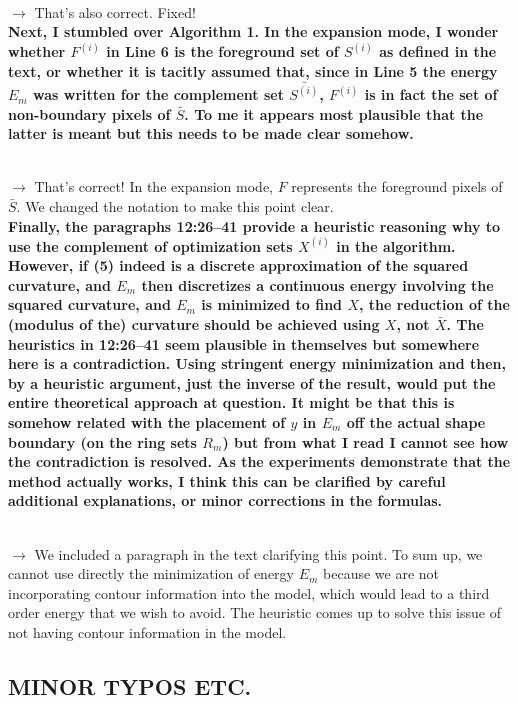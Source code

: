 \documentclass[12pt]{article}
\begin{document}
~\\
$\rightarrow$ That's also correct. Fixed!
~\\


\textbf{Next, I stumbled over Algorithm 1. In the expansion mode, I wonder whether $F^{(i)}$ in Line 6 is the foreground set of $S^{(i)}$ as defined in the text, or whether it is tacitly assumed that, since in Line 5 the energy $E_m$ was written for the complement set $\bar{S^{(i)}}$, $F^{(i)}$ is in fact the set of non-boundary pixels of $\bar{S}$. To me it appears most plausible that the latter is meant but this needs to be made clear somehow.}

~\\
$\rightarrow$ That's correct! In the expansion mode, $F$ represents the foreground pixels of $\bar{S}$. We changed the notation to make this point clear.
~\\



\textbf{Finally, the paragraphs 12:26--41 provide a heuristic reasoning why to use the complement of optimization sets $X^{(i)}$ in the algorithm. However, if (5) indeed is a discrete approximation of the squared curvature, and $E_m$ then discretizes a continuous energy involving the squared curvature, and $E_m$ is minimized to find $X$, the reduction of the (modulus of the) curvature should be achieved using $X$, not $\bar{X}$. The heuristics in 12:26--41 seem plausible in themselves but somewhere here is a contradiction. Using stringent energy minimization and then, by a heuristic argument, just the inverse of the result, would put the entire theoretical approach at question. It might be that this is somehow related with the placement of $y$ in $E_m$ off the actual shape boundary (on the ring sets $R_m$) but from what I read I cannot see how the contradiction is resolved. As the experiments demonstrate that the method actually works, I think this can be clarified by careful additional explanations, or minor corrections in the formulas.}

~\\
$\rightarrow$ We included a paragraph in the text clarifying this point. To sum up, we cannot use directly the minimization of energy $E_m$ because we are not incorporating contour information into the model, which would lead to a third order energy that we wish to avoid. The heuristic comes up to solve this issue of not having contour information in the model.
~\\

\subsection{MINOR TYPOS ETC.}
\end{document}
